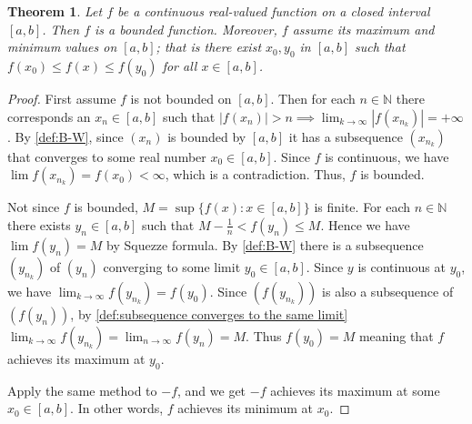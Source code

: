 \documentclass[12pt, lettersize]{book}
\theoremstyle{plain}
\newtheorem{thm}{Theorem}[section]
\theoremstyle{definition}
\theoremstyle{remark}
\newcommand{\N}{\mathbb{N}}
\begin{document}
			\begin{thm}\label{def:18.1}
			Let $f$ be a continuous real-valued function on a \emph{closed} interval $[a,b]$. Then $f$ is a bounded function.
			Moreover, $f$ assume its maximum and minimum values on $[a,b]$; that is there exist $x_0,y_0$ in $[a,b]$
			such that $f(x_0)\leq f(x)\leq f(y_0)$ for all $x\in[a,b]$.
			\end{thm}
			\begin{proof}
			First assume $f$ is not bounded on $[a,b]$. Then for each $n\in\N$ there corresponds an $x_n\in[a,b]$ such that
			$|f(x_n)|>n \implies \lim_{k\rightarrow\infty}|f(x_{n_k})|=+\infty$. By \ref{def:B-W}, since $(x_n)$ is bounded by $[a,b]$ it has a subsequence $(x_{n_k})$ that
			converges to some real number $x_0\in[a,b]$. Since $f$ is continuous, we have $\lim f(x_{n_k})=f(x_0)<\infty$,
			which is a contradiction. Thus, $f$ is bounded.
			
			Not since $f$ is bounded, $M=\sup\{f(x): x\in[a,b]\}$ is finite. For each $n\in\N$ there exists $y_n\in[a,b]$
			such that $M-\frac{1}{n}<f(y_n)\leq M$. Hence we have $\lim f(y_n)=M$ by Squezze formula. By \ref{def:B-W} there
			is a subsequence $(y_{n_k})$ of $(y_n)$ converging to some limit $y_0\in[a,b]$. Since $y$ is continuous at $y_0$, we have $\lim_{k\rightarrow\infty}f(y_{n_k})=f(y_0)$. Since $(f(y_{n_k}))$ is also a subsequence
			of $(f(y_n))$, by \ref{def:subsequence converges to the same limit} $\lim_{k\rightarrow\infty}f(y_{n_k})=
			\lim_{n\rightarrow\infty}f(y_n)=M$. Thus $f(y_0)=M$ meaning that $f$ achieves its maximum at $y_0$.
			
			Apply the same method to $-f$, and we get $-f$ achieves its maximum at some $x_0\in[a,b]$. In other words, $f$
			achieves its minimum at $x_0$.
			\end{proof}
			
\end{document}
